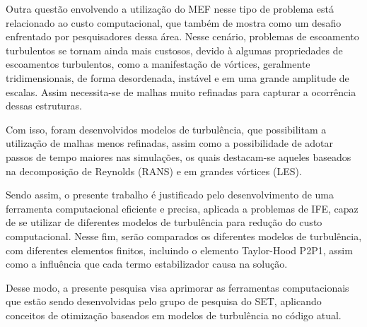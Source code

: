 Outra questão envolvendo a utilização do MEF nesse tipo de problema está relacionado ao custo computacional, que também de mostra como um desafio enfrentado por pesquisadores dessa área. Nesse cenário, problemas de escoamento turbulentos se tornam ainda mais custosos, devido à algumas propriedades de escoamentos turbulentos, como a manifestação de vórtices, geralmente tridimensionais, de forma desordenada, instável e em uma grande amplitude de escalas. Assim necessita-se de malhas muito refinadas para capturar a ocorrência dessas estruturas.

Com isso, foram desenvolvidos modelos de turbulência, que possibilitam a utilização de malhas menos refinadas, assim como a possibilidade de adotar passos de tempo maiores nas simulações, os quais destacam-se aqueles baseados na decomposição de Reynolds (RANS) e em grandes vórtices (LES).

Sendo assim, o presente trabalho é justificado pelo desenvolvimento de uma ferramenta computacional eficiente e precisa, aplicada a problemas de IFE, capaz de se utilizar de diferentes modelos de turbulência para redução do custo computacional. Nesse fim, serão comparados os diferentes modelos de turbulência, com diferentes elementos finitos, incluindo o elemento Taylor-Hood P2P1, assim como a influência que cada termo estabilizador causa na solução.

Desse modo, a presente pesquisa visa aprimorar as ferramentas computacionais que estão sendo desenvolvidas pelo grupo de pesquisa do SET, aplicando conceitos de otimização baseados em modelos de turbulência no código atual.